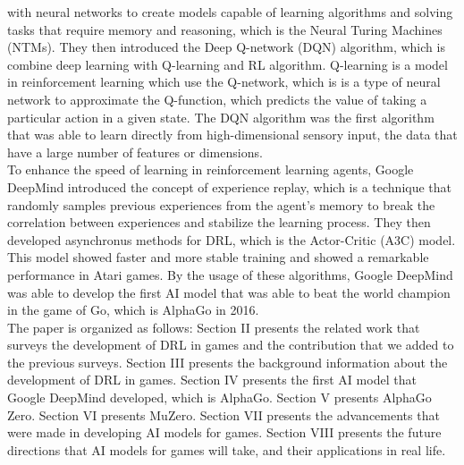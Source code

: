 with neural networks to create models capable of learning algorithms and
solving tasks that require memory and reasoning, which is the Neural Turing
Machines (NTMs)\cite{I4}. They then introduced the Deep Q-network (DQN)
algorithm, which is combine deep learning with Q-learning and RL algorithm.
Q-learning is a model in reinforcement learning which use the Q-network, which
is is a type of neural network to approximate the Q-function, which predicts
the value of taking a particular action in a given state\cite{I5}. The DQN
algorithm was the first algorithm that was able to learn directly from
high-dimensional sensory input, the data that have a large number of features
or dimensions\cite{I6}.\\ To enhance the speed of learning in reinforcement
learning agents, Google DeepMind introduced the concept of experience replay,
which is a technique that randomly samples previous experiences from the
agent's memory to break the correlation between experiences and stabilize the
learning process\cite{I7}. They then developed asynchronus methods for DRL,
which is the Actor-Critic (A3C) model. This model showed faster and more stable
training and showed a remarkable performance in Atari games\cite{I8}. By the
usage of these algorithms, Google DeepMind was able to develop the first AI
model that was able to beat the world champion in the game of Go, which is
AlphaGo in 2016.\\
The paper is organized as follows: Section II presents the related work that
surveys the development of DRL in games and the contribution that we 
added to the previous surveys. Section III presents the background 
information about the development of DRL in games. Section IV presents the
first AI model that Google DeepMind developed, which is AlphaGo. Section V
presents AlphaGo Zero. Section VI presents MuZero. Section VII presents the
advancements that were made in developing AI models for games. Section VIII 
presents the future directions that AI models for games will take, and their
applications in real life.